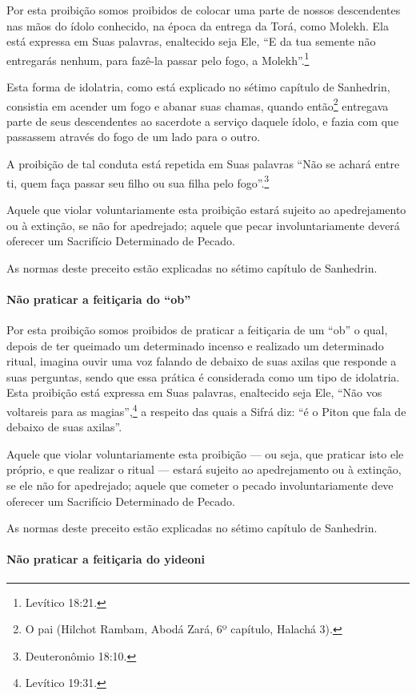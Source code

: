 Por esta proibição somos proibidos de colocar uma parte de nossos
descendentes nas mãos do ídolo conhecido, na época da entrega da Torá,
como Molekh. Ela está expressa em Suas palavras, enaltecido seja Ele,
``E da tua semente não entregarás nenhum, para fazê-la passar pelo fogo,
a Molekh''.\footnote{Levítico 18:21.}

Esta forma de idolatria, como está explicado no sétimo capítulo de
Sanhedrin, consistia em acender um fogo e abanar suas chamas, quando
então\footnote{O pai (Hilchot Rambam, Abodá Zará, 6º capítulo, Halachá 3).} entregava parte de seus descendentes ao
sacerdote a serviço daquele ídolo, e fazia com que passassem através do
fogo de um lado para o outro.

A proibição de tal conduta está repetida em Suas palavras ``Não se
achará entre ti, quem faça passar seu filho ou sua filha pelo fogo''.\footnote{Deuteronômio 18:10.}

Aquele que violar voluntariamente esta proibição estará sujeito ao
apedrejamento ou à extinção, se não for apedrejado; aquele que pecar
involuntariamente deverá oferecer um Sacrifício Determinado de Pecado.

As normas deste preceito estão explicadas no sétimo capítulo de Sanhedrin.

\paragraph{Não praticar a feitiçaria do ``ob''}

Por esta proibição somos proibidos de praticar a feitiçaria de um ``ob''
o qual, depois de ter queimado um determinado incenso e realizado um
determinado ritual, imagina ouvir uma voz falando de debaixo de suas
axilas que responde a suas perguntas, sendo que essa prática é considerada como um
tipo de idolatria. Esta proibição está expressa em Suas palavras,
enaltecido seja Ele, ``Não vos voltareis para as magias'',\footnote{Levítico
19:31.} a respeito das quais a Sifrá diz: ``é o Piton que fala de
debaixo de suas axilas''.

Aquele que violar voluntariamente esta proibição --- ou seja, que
praticar isto ele próprio, e que realizar o ritual --- estará sujeito ao
apedrejamento ou à extinção, se ele não for apedrejado; aquele que
cometer o pecado involuntariamente deve oferecer um Sacrifício
Determinado de Pecado.

As normas deste preceito estão explicadas no sétimo capítulo de Sanhedrin.

\paragraph{Não praticar a feitiçaria do yideoni}

